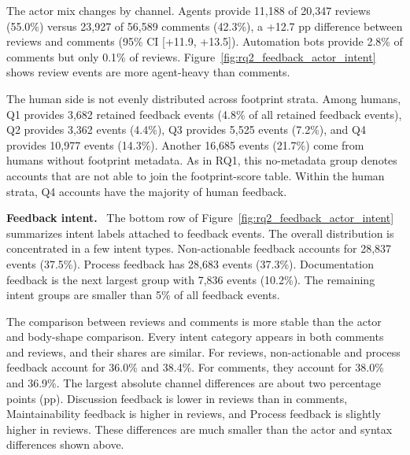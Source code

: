 \documentclass[10pt,conference,anonymous]{IEEEtran}
\newcommand{\runinhead}[1]{\noindent\textbf{#1.}\ }
\begin{document}
The actor mix changes by channel.
Agents provide 11,188 of 20,347 reviews (55.0\%) versus 23,927 of 56,589 comments (42.3\%), a +12.7 pp difference between reviews and comments (95\% CI [+11.9, +13.5]).
Automation bots provide 2.8\% of comments but only 0.1\% of reviews.
Figure~\ref{fig:rq2_feedback_actor_intent} shows review events are more agent-heavy than comments.

The human side is not evenly distributed across footprint strata.
Among humans, Q1 provides 3,682 retained feedback events (4.8\% of all retained feedback events), Q2 provides 3,362 events (4.4\%), Q3 provides 5,525 events (7.2\%), and Q4 provides 10,977 events (14.3\%).
Another 16,685 events (21.7\%) come from humans without footprint metadata.
As in RQ1, this no-metadata group denotes accounts that are not able to join the footprint-score table.
Within the human strata, Q4 accounts have the majority of human feedback.

\runinhead{Feedback intent}
The bottom row of Figure~\ref{fig:rq2_feedback_actor_intent} summarizes intent labels attached to feedback events.
The overall distribution is concentrated in a few intent types.
Non-actionable feedback accounts for 28,837 events (37.5\%).
Process feedback has 28,683 events (37.3\%).
Documentation feedback is the next largest group with 7,836 events (10.2\%).
The remaining intent groups are smaller than 5\% of all feedback events.

The comparison between reviews and comments is more stable than the actor and body-shape comparison.
Every intent category appears in both comments and reviews, and their shares are similar.
For reviews, non-actionable and process feedback account for 36.0\% and 38.4\%.
For comments, they account for 38.0\% and 36.9\%.
The largest absolute channel differences are about two percentage points (pp).
Discussion feedback is lower in reviews than in comments, Maintainability feedback is higher in reviews, and Process feedback is slightly higher in reviews.
These differences are much smaller than the actor and syntax differences shown above.
\end{document}
